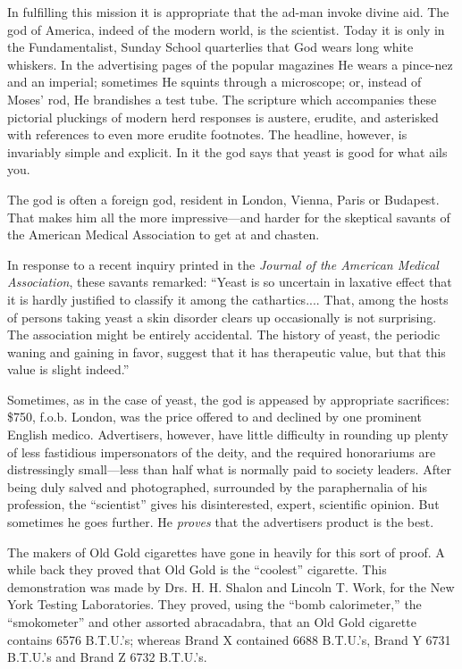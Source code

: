 \documentclass[openany,nobib]{tufte-book}
\begin{document}
In fulfilling this mission it is appropriate that the ad-man invoke
divine aid. The god of America, indeed of the modern world, is the
scientist. Today it is only in the Fundamentalist, Sunday School
quarterlies that God wears long white whiskers. In the advertising pages
of the popular magazines He wears a pince-nez and an imperial; sometimes
He squints through a microscope; or, instead of Moses' rod, He
brandishes a test tube. The scripture which accompanies these pictorial
pluckings of modern herd responses is austere, erudite, and asterisked
with references to even more erudite footnotes. The headline, however,
is invariably simple and explicit. In it the god says that yeast is good
for what ails you.

The god is often a foreign god, resident in London, Vienna, Paris or
Budapest. That makes him all the more impressive---and harder for the
skeptical savants of the American Medical Association to get at and
chasten.

In response to a recent inquiry printed in the \emph{Journal of the
American Medical Association}, these savants remarked: ``Yeast is so
uncertain in laxative effect that it is hardly justified to classify it
among the cathartics.... That, among the hosts of persons taking yeast a
skin disorder clears up occasionally is not surprising. The association
might be entirely accidental. The history of yeast, the periodic waning
and gaining in favor, suggest that it has therapeutic value, but that
this value is slight indeed.''

Sometimes, as in the case of yeast, the god is appeased by appropriate
sacrifices: \$750, f.o.b. London, was the price offered to and declined
by one prominent English medico. Advertisers, however, have little
difficulty in rounding up plenty of less fastidious impersonators of the
deity, and the required honorariums are distressingly small---less than
half what is normally paid to society leaders. After being duly salved
and photographed, surrounded by the paraphernalia of his profession, the
``scientist'' gives his disinterested, expert, scientific opinion. But
sometimes he goes further. He \emph{proves} that the advertisers product
is the best.

The makers of Old Gold cigarettes have gone in heavily for this sort of
proof. A while back they proved that Old Gold is the ``coolest''
cigarette. This demonstration was made by Drs. H. H. Shalon and Lincoln
T. Work, for the New York Testing Laboratories. They proved, using the
``bomb calorimeter,'' the ``smokometer'' and other assorted abracadabra,
that an Old Gold cigarette contains 6576 B.T.U.'s; whereas Brand X
contained 6688 B.T.U.'s, Brand Y 6731 B.T.U.'s and Brand Z 6732
B.T.U.'s.
\end{document}
